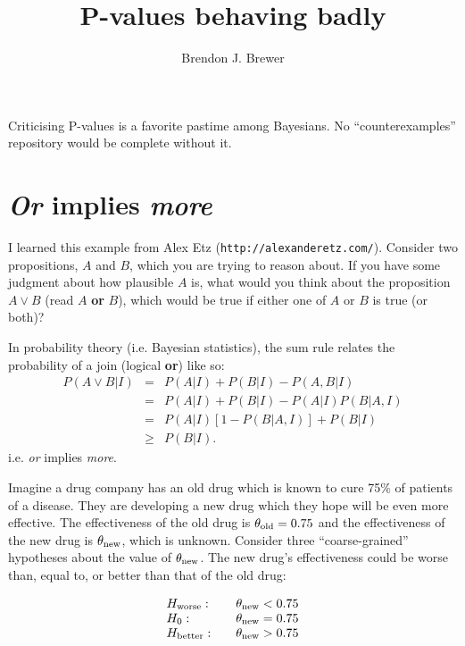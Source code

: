 \documentclass[a4paper, 12pt]{article}
\title{P-values behaving badly}
\author{Brendon J. Brewer}
\begin{document}
\maketitle

Criticising P-values is a favorite pastime among Bayesians. No
``counterexamples'' repository would be complete without it.

\section{{\em Or} implies {\em more}}
I learned this example from Alex Etz ({\tt http://alexanderetz.com/}).
Consider two propositions, $A$ and $B$, which you are trying to reason about.
If you have some judgment about how plausible $A$ is, what would you think
about the proposition $A \vee B$ (read $A$ {\bf or} $B$), which would be true
if either one of $A$ or $B$ is true (or both)? 



In probability theory (i.e. Bayesian statistics), the sum rule relates the
probability of a join (logical {\bf or}) like so:
\begin{eqnarray}
P(A \vee B | I) &=& P(A | I) + P(B | I) - P(A, B | I)\\
                &=& P(A | I) + P(B | I) - P(A | I)P(B | A, I)\\
                &=& P(A | I)\left[1 - P(B | A,I)\right] + P(B | I)\\
                &\geq& P(B | I). 
\end{eqnarray}
i.e. {\em or} implies {\em more}.


Imagine a drug company has an old drug which is known to cure
75\% of patients of a disease. They are developing a new drug
which they hope will be even more effective.
The effectiveness of the old drug is $\theta_{\rm old} = 0.75$ and the
effectiveness of the new drug is $\theta_{\rm new}$, which is unknown.
Consider three ``coarse-grained''
hypotheses about the value of $\theta_{\rm new}$. The new drug's
effectiveness could be worse than, equal to, or better than that of the old
drug:

\begin{equation}
\begin{array}{lcl}
H_{\rm worse}:  &  &\theta_{\rm new} < 0.75\\
H_0:            &  &\theta_{\rm new} = 0.75\\
H_{\rm better}: &  &\theta_{\rm new} > 0.75
\end{array}
\end{equation}
\end{document}
